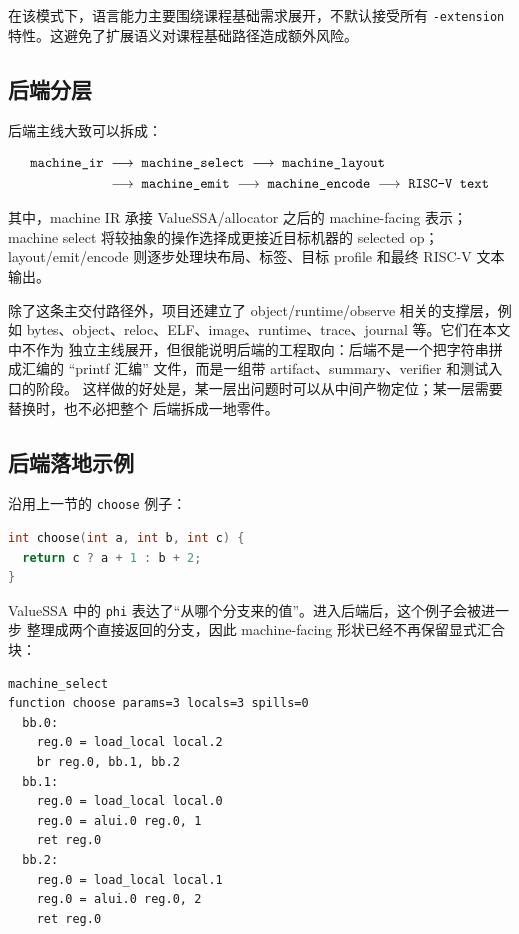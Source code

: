 \documentclass[UTF8,a4paper,11pt]{ctexart}
\newcommand{\stage}[1]{\text{\texttt{#1}}}
\newcommand{\nextstage}{\;\longrightarrow\;}
\begin{document}
在该模式下，语言能力主要围绕课程基础需求展开，不默认接受所有
\texttt{-extension} 特性。这避免了扩展语义对课程基础路径造成额外风险。

\subsection{后端分层}

后端主线大致可以拆成：

\[
\begin{aligned}
\stage{machine\_ir}
&\nextstage \stage{machine\_select}
\nextstage \stage{machine\_layout} \\
&\nextstage \stage{machine\_emit}
\nextstage \stage{machine\_encode}
\nextstage \stage{RISC-V text}
\end{aligned}
\]

其中，machine IR 承接 ValueSSA/allocator 之后的 machine-facing 表示；
machine select 将较抽象的操作选择成更接近目标机器的 selected op；
layout/emit/encode 则逐步处理块布局、标签、目标 profile 和最终 RISC-V 文本输出。

除了这条主交付路径外，项目还建立了 object/runtime/observe 相关的支撑层，例如
bytes、object、reloc、ELF、image、runtime、trace、journal 等。它们在本文中不作为
独立主线展开，但很能说明后端的工程取向：后端不是一个把字符串拼成汇编的
``printf 汇编'' 文件，而是一组带 artifact、summary、verifier 和测试入口的阶段。
这样做的好处是，某一层出问题时可以从中间产物定位；某一层需要替换时，也不必把整个
后端拆成一地零件。

\subsection{后端落地示例}

沿用上一节的 \texttt{choose} 例子：

\begin{lstlisting}[language=C]
int choose(int a, int b, int c) {
  return c ? a + 1 : b + 2;
}
\end{lstlisting}

ValueSSA 中的 \texttt{phi} 表达了“从哪个分支来的值”。进入后端后，这个例子会被进一步
整理成两个直接返回的分支，因此 machine-facing 形状已经不再保留显式汇合块：

\begin{lstlisting}[language={}]
machine_select
function choose params=3 locals=3 spills=0
  bb.0:
    reg.0 = load_local local.2
    br reg.0, bb.1, bb.2
  bb.1:
    reg.0 = load_local local.0
    reg.0 = alui.0 reg.0, 1
    ret reg.0
  bb.2:
    reg.0 = load_local local.1
    reg.0 = alui.0 reg.0, 2
    ret reg.0
\end{lstlisting}
\end{document}
